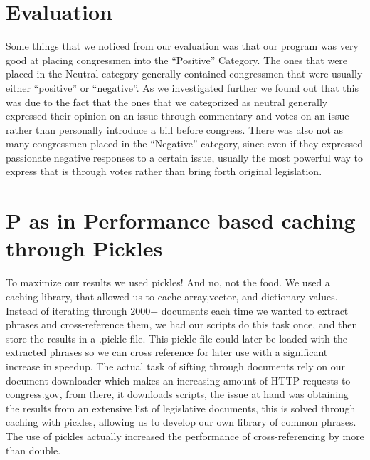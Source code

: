 \documentclass[12pt]{article}
\begin{document}
\section{Evaluation}
\par{Some things that we noticed from our evaluation was that our program was very good at placing congressmen into the “Positive” Category. The ones that were placed in the Neutral category generally contained congressmen that were usually either “positive” or “negative”. As we investigated further we found out that this was due to the fact that the ones that we categorized as neutral generally expressed their opinion on an issue through commentary and votes on an issue rather than personally introduce a bill before congress. There was also not as many congressmen placed in the “Negative” category, since even if they expressed passionate negative responses to a certain issue, usually the most powerful way to express that is through votes rather than bring forth original legislation.}


\par{}

\section{P as in Performance based caching through Pickles}
\par{To maximize our results we used pickles! And no, not the food. We used a caching library, that allowed us to cache array,vector, and dictionary values. Instead of iterating through 2000+ documents each time we wanted to extract phrases and cross-reference them, we had our scripts do this task once, and then store the results in a .pickle file. This pickle file could later be loaded with the extracted phrases so we can cross reference for later use with a significant increase in speedup. The actual task of sifting through documents rely on our document downloader which makes an increasing amount of HTTP requests to congress.gov, from there, it downloads scripts, the issue at hand was obtaining the results from an extensive list of legislative documents, this is solved through caching with pickles, allowing us to develop our own library of common phrases. The use of pickles actually increased the performance of cross-referencing by more than double.  }
\end{document}
